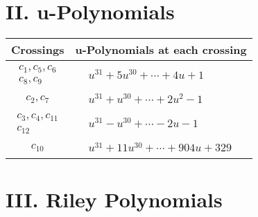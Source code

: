 \documentclass[1p]{elsarticle_modified}
\theoremstyle{definition}
\begin{document}
\newpage\renewcommand{\arraystretch}{1}
\centering \section*{ II. u-Polynomials}
\begin{tabular}{m{50pt}|m{274pt}}
Crossings & \hspace{64pt}u-Polynomials at each crossing \\
\hline $$\begin{aligned}c_{1},c_{5},c_{6}\\c_{8},c_{9}\end{aligned}$$&$\begin{aligned}
&u^{31}+5 u^{30}+\cdots+4 u+1
\end{aligned}$\\
\hline $$\begin{aligned}c_{2},c_{7}\end{aligned}$$&$\begin{aligned}
&u^{31}+u^{30}+\cdots+2 u^2-1
\end{aligned}$\\
\hline $$\begin{aligned}c_{3},c_{4},c_{11}\\c_{12}\end{aligned}$$&$\begin{aligned}
&u^{31}- u^{30}+\cdots-2 u-1
\end{aligned}$\\
\hline $$\begin{aligned}c_{10}\end{aligned}$$&$\begin{aligned}
&u^{31}+11 u^{30}+\cdots+904 u+329
\end{aligned}$\\
\hline
\end{tabular}\newpage\renewcommand{\arraystretch}{1}
\centering \section*{ III. Riley Polynomials}
\end{document}
